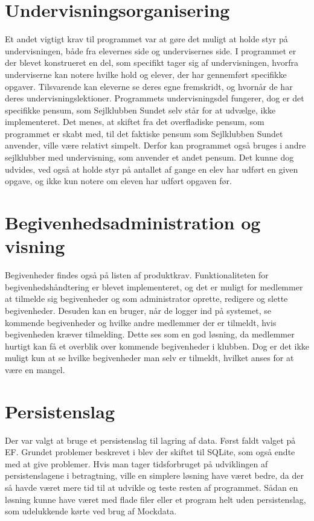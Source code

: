 \section*{Undervisningsorganisering}

Et andet vigtigt krav til programmet var at gøre det muligt at holde styr på undervisningen, både fra elevernes side og undervisernes side. 
I programmet er der blevet konstrueret en del, som specifikt tager sig af undervisningen, hvorfra underviserne kan notere hvilke hold og elever, der har gennemført specifikke opgaver.
Tilsvarende kan eleverne se deres egne fremskridt, og hvornår de har deres undervisningslektioner.
Programmets undervisningsdel fungerer, dog er det specifikke pensum, som Sejlklubben Sundet selv står for at udvælge, ikke implementeret. 
Det menes, at skiftet fra det overfladiske pensum, som programmet er skabt med, til det faktiske pensum som Sejlklubben Sundet anvender, ville være relativt simpelt. 
Derfor kan programmet også bruges i andre sejlklubber med undervisning, som anvender et andet pensum. 
Det kunne dog udvides, ved også at holde styr på antallet af gange en elev har udført en given opgave, og ikke kun notere om eleven har udført opgaven før.


\section*{Begivenhedsadministration og visning}

Begivenheder findes også på listen af produktkrav.
Funktionaliteten for begivenhedshåndtering er blevet implementeret, og det er muligt for medlemmer at tilmelde sig begivenheder og som administrator oprette, redigere og slette begivenheder. 
Desuden kan en bruger, når de logger ind på systemet, se kommende begivenheder og hvilke andre medlemmer der er tilmeldt, hvis begivenheden kræver tilmelding. 
Dette ses som en god løsning, da medlemmer hurtigt kan få et overblik over kommende begivenheder i klubben.
Dog er det ikke muligt kun at se hvilke begivenheder man selv er tilmeldt, hvilket anses for at være en mangel. 


\section*{Persistenslag}

Der var valgt at bruge et persistenslag til lagring af data. 
Først faldt valget på \acl{EF}. 
Grundet problemer beskrevet i  blev der skiftet til SQLite, som også endte med at give problemer. 
Hvis man tager tidsforbruget på udviklingen af persistenslagene i betragtning, ville en simplere løsning have været bedre, da der så havde været mere tid til at udvikle og teste resten af programmet.
Sådan en løsning kunne have været med flade filer eller et program helt uden persistenslag, som udelukkende kørte ved brug af Mockdata.  


